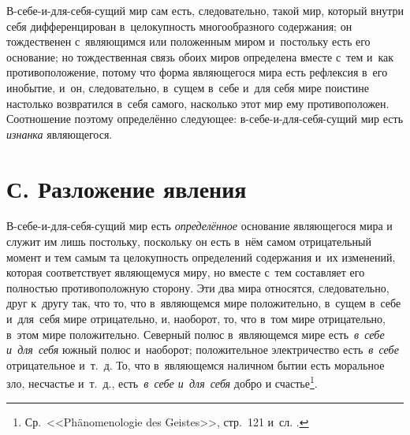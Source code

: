 В-себе-и-для-себя-сущий мир сам есть, следовательно, такой мир, который
внутри себя дифференцирован в~целокупность многообразного содержания; он
тождественен с~являющимся или положенным миром и~постольку есть его
основание; но тождественная связь обоих миров определена вместе с~тем и~как
противоположение, потому что форма являющегося мира есть рефлексия в~его
инобытие, и~он, следовательно, в~сущем в~себе и~для себя мире поистине
настолько возвратился в~себя самого, насколько этот мир ему противоположен.
Соотношение поэтому определённо следующее: в-себе-и-для-себя-сущий мир есть
{\em изнанка} являющегося.


\section[С. Разложение явления]{С. Разложение явления}

В-себе-и-для-себя-сущий мир есть {\em определённое} основание являющегося мира
и служит им лишь постольку, поскольку он есть в~нём самом отрицательный момент
и тем самым та целокупность определений содержания и~их изменений, которая
соответствует являющемуся миру, но вместе с~тем составляет его полностью
противоположную сторону. Эти два мира относятся, следовательно, друг к~другу
так, что то, что в~являющемся мире положительно, в~сущем в~себе и~для~себя мире
отрицательно, и, наоборот, то, что в~том мире отрицательно, в~этом мире
положительно. Северный полюс в~являющемся мире есть~{\em в~себе и~для~себя}
южный полюс и~наоборот; положительное электричество есть~{\em в~себе}
отрицательное и~т.~д. То, что в~являющемся наличном бытии есть моральное зло,
несчастье и~т.~д., есть~{\em в~себе и~для~себя} добро и
счастье\footnote{Ср.~<<Phäno\-meno\-logie des Geistes>>, стр.~121 и~сл.
.}.

